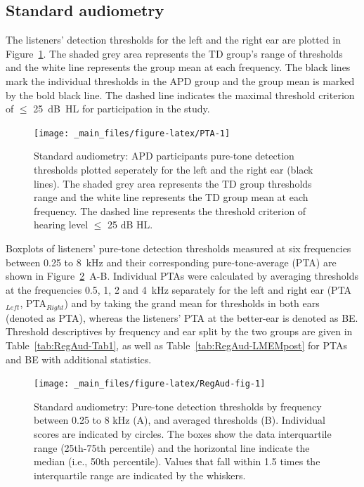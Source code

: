 \documentclass[a4paper, twoside]{templates/ociamthesis}
\begin{document}
\hypertarget{standard-audiometry}{%
\subsection{Standard audiometry}\label{standard-audiometry}}

The listeners' detection thresholds for the left and the right ear are plotted in Figure~\ref{fig:PTA}. The shaded grey area represents the TD group's range of thresholds and the white line represents the group mean at each frequency. The black lines mark the individual thresholds in the APD group and the group mean is marked by the bold black line. The dashed line indicates the maximal threshold criterion of \(\leq\) 25~dB~HL for participation in the study.\\

\begin{figure}

{\centering \texttt{[image: \_main\_files/figure-latex/PTA-1]} 

}

\caption{Standard audiometry: APD participants pure-tone detection thresholds plotted seperately for the left and the right ear (black lines). The shaded grey area represents the TD group thresholds range and the white line represents the TD group mean at each frequency. The dashed line represents the threshold criterion of hearing level $\leq$ 25 dB HL.}\label{fig:PTA}
\end{figure}

Boxplots of listeners' pure-tone detection thresholds measured at six frequencies between 0.25 to 8~kHz and their corresponding pure-tone-average (PTA) are shown in Figure~\ref{fig:RegAud-fig}~A-B. Individual PTAs were calculated by averaging thresholds at the frequencies 0.5, 1, 2 and 4~kHz separately for the left and right ear (PTA\(_{Left}\), PTA\(_{Right}\)) and by taking the grand mean for thresholds in both ears (denoted as PTA), whereas the listeners' PTA at the better-ear is denoted as BE. Threshold descriptives by frequency and ear split by the two groups are given in Table~\ref{tab:RegAud-Tab1}, as well as Table~\ref{tab:RegAud-LMEMpost} for PTAs and BE with additional statistics.\\

\begin{figure}

{\centering \texttt{[image: \_main\_files/figure-latex/RegAud-fig-1]} 

}

\caption{Standard audiometry: Pure-tone detection thresholds by frequency between 0.25 to 8 kHz (A), and averaged thresholds (B). Individual scores are indicated by circles. The boxes show the data interquartile range (25th-75th percentile) and the horizontal line indicate the median (i.e., 50th percentile). Values that fall within 1.5 times the interquartile range are indicated by the whiskers.}\label{fig:RegAud-fig}
\end{figure}
\end{document}
